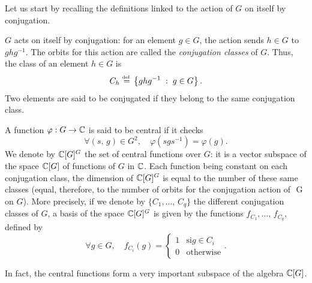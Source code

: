  
Let us start by recalling the definitions linked to the action of $G$ on itself by conjugation.
 
\begin{defn}
  $G$ acts on itself by conjugation: for an element $ g \in G $, the action sends $ h \in G $ to $ ghg^{-1} $. The orbits for this action are called the \textit{conjugation classes} of $G$. Thus, the class of an element $ h \in G $ is
\begin{equation*}
C_h \stackrel{\mbox{\upshape\tiny def.}}{=} \left\{ ghg^{-1} \;:\; g \in G \right\}.
\end{equation*}
Two elements are said to be conjugated if they belong to the same conjugation class.
\end{defn}
 
 
 
 
 
\begin{defn}
  A function $ \varphi: G \rightarrow \mathbb{C} $ is said to be central if it checks
\begin{equation*}
\forall (s, \, g) \in G^2, \quad \varphi (sgs^{-1}) = \varphi (g).
\end{equation*}
We denote by $ \mathbb{C} [G]^{G} $ the set of central functions over $G$: it is a vector subspace of the space $ \mathbb{C} [G] $ of functions of $G$ in $ \mathbb{C} $. Each function being constant on each conjugation class, the dimension of $ \mathbb{C} [G]^{G} $ is equal to the number of these same classes (equal, therefore, to the number of orbits for the conjugation action of $ $ G on $G$). More precisely, if we denote by $ \{C_1, \ldots, \, C_q\} $ the different conjugation classes of $G$, a basis of the space $ \mathbb{C} [G]^G $ is given by the functions $ f_{C_1}, \ldots, \, f_{C_q} $, defined by
\begin{equation}
\label{eq-function-char-class}
\forall g \in G, \quad f_{C_i} (g) = \left\{\begin{array}{ll} 1 & \text{si} g \in C_i \\0 & \text{otherwise} \end{array} \right. .
\end{equation}
\end{defn}
In fact, the central functions form a very important subspace of the algebra $ \mathbb{C} [G] $.
 
